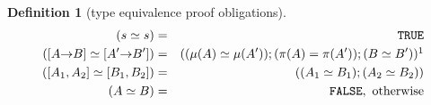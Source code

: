 \documentclass [12pt,twoside]{cslreport}
\newcommand{\thmbox}
   {{\ \hfill\hbox{%
      \vrule width1.0ex height1.0ex
   }\parfillskip 0pt }}
\newcommand{\aro}{\mathord\rightarrow} %
\newcommand{\funtype}[2]{[#1 \aro #2]}
\newcommand{\tupletype}[1]{[#1]}
\newcommand{\listwo}[2]{#1_{1}, #1_{2}}
\newcommand{\tttrue}{\mathtt{TRUE}}
\newcommand{\ttfalse}{\mathtt{FALSE}}
\newtheorem{definition}{Definition}
\newenvironment{Defn}[1]{\begin{definition}[#1]\label{defn:#1}}{
\thmbox\end{definition}}
\begin{document}
\begin{Defn}{type equivalence proof obligations}
\begin{eqnarray*}
  (s \simeq s) & = & \tttrue \\
%
  (\funtype{A}{B} \simeq \funtype{A'}{B'}) & = & ((\mu(A)\simeq \mu(A'));
(\pi(A) = \pi(A'));
 (B \simeq B'))\footnotemark \\
%
  (\tupletype{\listwo{A}{n}} \simeq \tupletype{\listwo{B}{n}}) & = &
    ((A_1\simeq B_1); (A_2\simeq B_2)) \\
%
 (A \simeq B) & = & \ttfalse, \mbox{ otherwise}
\end{eqnarray*}
\end{Defn}
\end{document}
